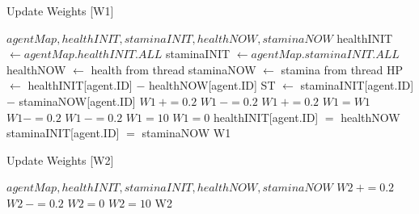 

\begin{algorithm}
\caption{Update Weights [W1]}\label{alg:6}
\begin{algorithmic} 
\scriptsize
\Require $agentMap, healthINIT, staminaINIT,healthNOW, staminaNOW$
\State healthINIT $\leftarrow agentMap.healthINIT.ALL$
\State staminaINIT $\leftarrow agentMap.staminaINIT.ALL$
\State healthNOW $\leftarrow$ health from thread
\State staminaNOW $\leftarrow$ stamina from thread
\State HP $\leftarrow$ healthINIT[agent.ID] $-$ healthNOW[agent.ID]
\State ST $\leftarrow$ staminaINIT[agent.ID] $-$ staminaNOW[agent.ID]
\State $W1~+= 0.2$
\Else
\State $W1~-= 0.2$
\EndIf
{}
\State $W1~+= 0.2$
\Else
{}
\State $W1 = W1$
\Else
\State $W1 -= 0.2$
\EndIf
\State $W1~-= 0.2$
\EndIf
{}
\State $W1=10$
\EndIf
{}
\State $W1 = 0$
\EndIf
\State healthINIT[agent.ID] $=$ healthNOW
\State staminaINIT[agent.ID] $=$ staminaNOW
\Return W1
\EndIf
\end{algorithmic}
\end{algorithm}



\begin{algorithm}
\caption{Update Weights [W2]}\label{alg:7}
\begin{algorithmic} 
\scriptsize
\Require $agentMap, healthINIT, staminaINIT,healthNOW, staminaNOW$
\State $W2~+= 0.2$
\Else
\State $W2~-= 0.2$
\EndIf
{}
\State $W2 = 0$
\EndIf
{}
\State $W2 = 10$
\EndIf
\State
\Return W2
\end{algorithmic}
\end{algorithm}

